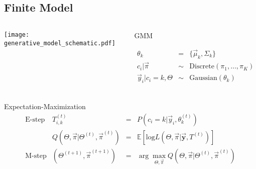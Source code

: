 \documentclass{beamer}
\begin{document}
\subsection{Finite Model}
\begin{frame}{}
\begin{columns}[top]
\begin{center}
		\texttt{[image: generative\_model\_schematic.pdf]}
\end{center}
\begin{block}{GMM}

\begin{eqnarray*}
\theta_k &=& \{\vec \mu_k,\Sigma_k\} \\
c_i | \vec \pi &\sim& \mbox{Discrete}(\pi_1, \ldots, \pi_K) \\
\vec y_i | c_i=k, \Theta &\sim& \mbox{Gaussian}(\theta_k) \\
\end{eqnarray*}

\end{block}
\end{columns}
\begin{block}{Expectation-Maximization}
\[
\begin{array}{llll}
\text{E-step} & T^{(t)}_{i,k} & = & P(c_i = k|\vec{y}_i,\theta^{(t)}_k)\\
& Q(\Theta,\vec{\pi}|\Theta^{(t)},\vec{\pi}^{(t)}) & = & \mathbb{E}[\text{log}L(\Theta,\vec{\pi}|\vec{\mathbf{y}},T^{(t)})] \\
\text{M-step} & (\Theta^{(t+1)},\vec{\pi}^{(t+1)}) & = & \arg\max_{\Theta,\vec{\pi}} Q(\Theta,\vec{\pi}|\Theta^{(t)},\vec{\pi}^{(t)})
\end{array}
\]
\end{block}
\end{frame}
\end{document}
